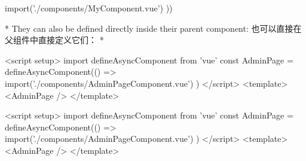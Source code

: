 \begin{paracol}{2}
\begin{codeJs}
  import('./components/MyComponent.vue')
))
\end{codeJs}
\switchcolumn[0]*%
They can also be defined directly inside their parent component:
\switchcolumn
也可以直接在父组件中直接定义它们：
\switchcolumn[0]*%
\begin{codeHtml}
<script setup>
import { defineAsyncComponent } from 'vue'
const AdminPage = defineAsyncComponent(() =>
  import('./components/AdminPageComponent.vue')
)
</script>
<template>
  <AdminPage />
</template>
\end{codeHtml}
\switchcolumn
\begin{codeHtml}
<script setup>
import { defineAsyncComponent } from 'vue'
const AdminPage = defineAsyncComponent(() =>
  import('./components/AdminPageComponent.vue')
)
</script>
<template>
  <AdminPage />
</template>
\end{codeHtml}
\end{paracol}

